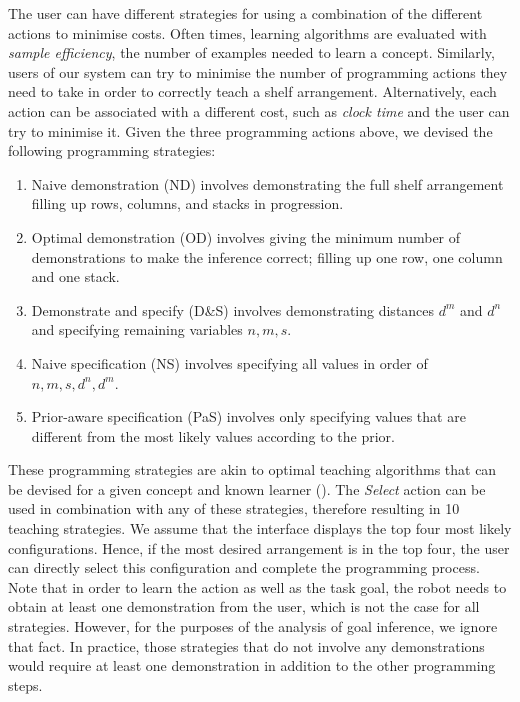 The user can have different strategies for using a combination of the different actions to minimise costs.
Often times, learning algorithms are evaluated with {\em sample efficiency}, \ie the number of examples needed to learn a concept.
Similarly, users of our system can try to minimise the number of programming actions they need to take in order to correctly teach a shelf arrangement.
Alternatively, each action can be associated with a different cost, such as {\em clock time} and the user can try to minimise it.
Given the three programming actions above, we devised the following programming strategies:
\begin{enumerate}
	\item Naive demonstration (ND) involves demonstrating the full shelf arrangement filling up rows, columns, and stacks in progression.
	\item Optimal demonstration (OD) involves giving the minimum number of demonstrations to make the inference correct; \ie filling up one row, one column and one stack.
	\item Demonstrate and specify (D\&S) involves demonstrating distances $d^m$ and $d^n$ and specifying remaining variables $n,m,s$.
	\item Naive specification (NS) involves specifying all values in order of $n, m, s, d^n, d^m$.
	\item Prior-aware specification (PaS) involves only specifying values that are different from the most likely values according to the prior.
\end{enumerate}

These programming strategies are akin to optimal teaching algorithms that can be devised for a given concept and known learner (\cite{cakmak2012aaai,khan2011humans}).
The \textit{Select} action can be used in combination with any of these strategies, therefore resulting in 10 teaching strategies.
We assume that the interface displays the top four most likely configurations.
Hence, if the most desired arrangement is in the top four, the user can directly select this configuration and complete the programming process.
Note that in order to learn the action as well as the task goal, the robot needs to obtain at least one demonstration from the user, which is not the case for all strategies.
However, for the purposes of the analysis of goal inference, we ignore that fact.
In practice, those strategies that do not involve any demonstrations would require at least one demonstration in addition to the other programming steps.

